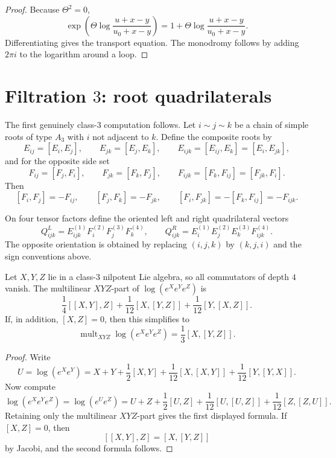 \begin{proof}
Because $\Theta^2=0$,
\[
\exp\left(\Theta\log\!\frac{u+x-y}{u_0+x-y}\right)
=1+\Theta\log\!\frac{u+x-y}{u_0+x-y}.
\]
Differentiating gives the transport equation. The monodromy follows by
adding $2\pi i$ to the logarithm around a loop.
\end{proof}

\section{Filtration $3$: root quadrilaterals}

The first genuinely class-$3$ computation follows.
Let $i\sim j\sim k$ be a chain of simple roots of type $A_3$ with
$i$ not adjacent to $k$. Define the composite roots by
\[
E_{ij}=[E_i,E_j],
\qquad
E_{jk}=[E_j,E_k],
\qquad
E_{ijk}=[E_{ij},E_k]=[E_i,E_{jk}],
\]
and for the opposite side set
\[
F_{ij}=[F_j,F_i],
\qquad
F_{jk}=[F_k,F_j],
\qquad
F_{ijk}=[F_k,F_{ij}]=[F_{jk},F_i].
\]
Then
\[
[F_i,F_j]=-F_{ij},
\qquad
[F_j,F_k]=-F_{jk},
\qquad
[F_i,F_{jk}]=-[F_k,F_{ij}]=-F_{ijk}.
\]

\begin{definition}
On four tensor factors define the oriented left and right quadrilateral
vectors
\[
Q_{ijk}^{L}=E_{ijk}^{(1)}F_i^{(2)}F_j^{(3)}F_k^{(4)},
\qquad
Q_{ijk}^{R}=E_i^{(1)}E_j^{(2)}E_k^{(3)}F_{ijk}^{(4)}.
\]
The opposite orientation is obtained by replacing $(i,j,k)$ by
$(k,j,i)$ and the sign conventions above.
\end{definition}

\begin{lemma}
\ClaimStatusProvedHere
\label{lem:class3-ordered-bch}
Let $X,Y,Z$ lie in a class-$3$ nilpotent Lie algebra, so all
commutators of depth $4$ vanish. The multilinear $XYZ$-part of
$\log(e^Xe^Ye^Z)$ is
\[
\frac14[[X,Y],Z]+\frac1{12}[X,[Y,Z]]+\frac1{12}[Y,[X,Z]].
\]
If, in addition, $[X,Z]=0$, then this simplifies to
\[
\operatorname{mult}_{XYZ}\log(e^Xe^Ye^Z)
=\frac13[X,[Y,Z]].
\]
\end{lemma}

\begin{proof}
Write
\[
U=\log(e^Xe^Y)=X+Y+\frac12[X,Y]+\frac1{12}[X,[X,Y]]
+\frac1{12}[Y,[Y,X]].
\]
Now compute
\[
\log(e^Xe^Ye^Z)=\log(e^Ue^Z)
=U+Z+\frac12[U,Z]+\frac1{12}[U,[U,Z]]+\frac1{12}[Z,[Z,U]].
\]
Retaining only the multilinear $XYZ$-part gives the first displayed
formula. If $[X,Z]=0$, then
\[
[[X,Y],Z]=[X,[Y,Z]]
\]
by Jacobi, and the second formula follows.
\end{proof}


